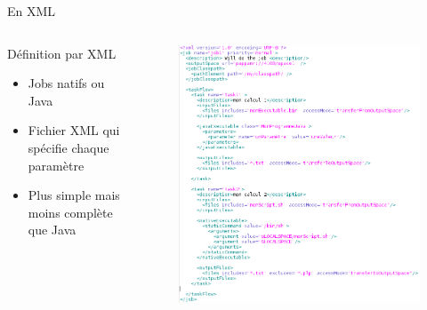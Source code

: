 \documentclass{beamer}
\begin{document}
\begin{frame}{En XML}
	\begin{columns}
	\begin{column}[l]{0.4\linewidth}
        \begin{block}{Définition par XML}
            \begin{itemize}
                \item Jobs natifs ou Java
                \item Fichier XML qui spécifie chaque paramètre
                \item Plus simple mais moins complète que Java
            \end{itemize}
        \end{block}
	\end{column}
	\begin{column}[r]{0.6\linewidth}
        \vspace{-1cm}
        \begin{figure}
            \centering
            \includegraphics[scale=0.27]{jobxml.png}
        \end{figure}
	\end{column}
	\end{columns}
    
\end{frame}
\end{document}
